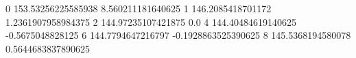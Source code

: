 0 153.53256225585938 8.560211181640625
1 146.2085418701172 1.2361907958984375
2 144.97235107421875 0.0
4 144.40484619140625 -0.5675048828125
6 144.7794647216797 -0.1928863525390625
8 145.5368194580078 0.5644683837890625
